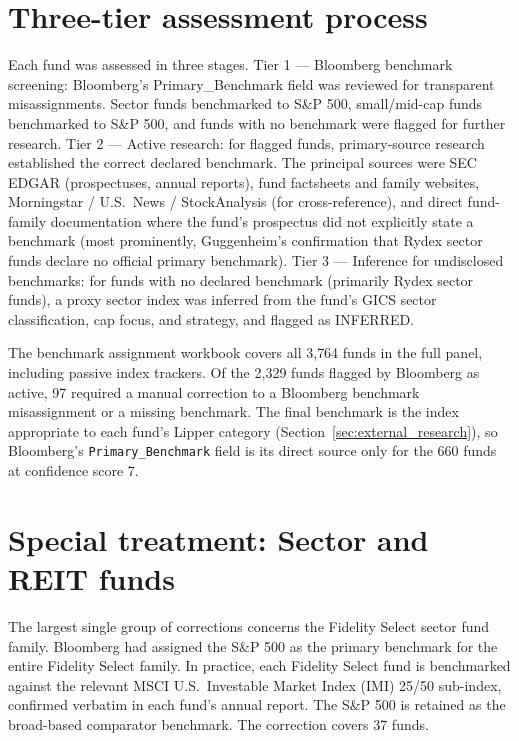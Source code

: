 \documentclass[12pt, oneside]{report}
\begin{document}
\section{Three-tier assessment process}
\label{sec:benchmark_tiers}

\noindent Each fund was assessed in three stages. Tier 1 ---
Bloomberg benchmark screening: Bloomberg's Primary\_Benchmark
field was reviewed for transparent misassignments. Sector funds
benchmarked to S\&P 500, small/mid-cap funds benchmarked to S\&P 500,
and funds with no benchmark were flagged for further research.
Tier 2 --- Active research: for flagged funds, primary-source
research established the correct declared benchmark. The principal
sources were SEC EDGAR (prospectuses, annual reports), fund
factsheets and family websites, Morningstar / U.S.\ News /
StockAnalysis (for cross-reference), and direct fund-family
documentation where the fund's prospectus did not explicitly state a
benchmark (most prominently, Guggenheim's confirmation that Rydex
sector funds declare no official primary benchmark).
Tier 3 --- Inference for undisclosed benchmarks: for funds
with no declared benchmark (primarily Rydex sector funds), a proxy
sector index was inferred from the fund's GICS sector classification,
cap focus, and strategy, and flagged as INFERRED.

The benchmark assignment workbook covers all 3{,}764 funds in the
full panel, including passive index trackers. Of the 2{,}329 funds
flagged by Bloomberg as active, 97 required a manual correction to a Bloomberg benchmark
misassignment or a missing benchmark. The final benchmark is the index
appropriate to each fund's Lipper category (Section~\ref{sec:external_research}),
so Bloomberg's \texttt{Primary\_Benchmark} field is its direct source only
for the 660 funds at confidence score 7.

\section{Special treatment: Sector and REIT funds}
\label{sec:special_treatment}

\noindent The largest single group of corrections concerns the
Fidelity Select sector fund family. Bloomberg had assigned the
S\&P 500 as the primary benchmark for the entire Fidelity Select
family. In practice, each Fidelity Select fund is benchmarked
against the relevant MSCI U.S.\ Investable Market Index (IMI) 25/50
sub-index, confirmed verbatim in each fund's annual report. The
S\&P 500 is retained as the broad-based comparator benchmark. The
correction covers 37 funds.
\end{document}
